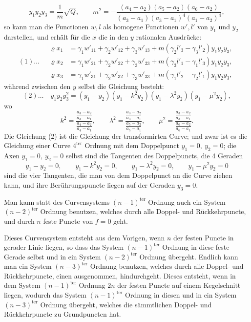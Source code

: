 \documentclass[10pt]{article}
\begin{document}
\[
y_1y_2y_3=\frac{1}{m}\sqrt Q,\qquad
m^2=-\frac{(a_4-a_2)(a_5-a_2)(a_6-a_2)}
{(a_3-a_1)(a_3-a_1)^4(a_1-a_2)^4},
\]
so kann man die Functionen \(w,l\) als homogene Functionen \(w',l'\) von \(y_1\) und \(y_2\) darstellen, und erhält für die \(x\) die in den \(y\) rationalen Ausdrücke:
\[
(1)\ldots\quad
\begin{aligned}
\varrho x_1&=\gamma_1w'_{11}+\gamma_2w'_{12}+\gamma_3w'_{13}
+m(\gamma_2l'_3-\gamma_3l'_2)y_1y_2y_3,\\
\varrho x_2&=\gamma_1w'_{21}+\gamma_2w'_{22}+\gamma_3w'_{23}
+m(\gamma_3l'_1-\gamma_1l'_3)y_1y_2y_3,\\
\varrho x_3&=\gamma_1w'_{31}+\gamma_2w'_{32}+\gamma_3w'_{33}
+m(\gamma_1l'_2-\gamma_2l'_1)y_1y_2y_3,
\end{aligned}
\]
während zwischen den \(y\) selbst die Gleichung besteht:
\[
(2)\ldots\quad
y_1y_2y_3^2=(y_1-y_2)(y_1-k^2y_2)(y_1-\lambda^2y_2)(y_1-\mu^2y_2),
\]
wo
\[
k^2=\frac{\frac{a_3-a_2}{a_3-a_1}}{\frac{a_4-a_2}{a_4-a_1}},
\qquad
\lambda^2=\frac{\frac{a_3-a_2}{a_3-a_1}}{\frac{a_5-a_2}{a_5-a_1}},
\qquad
\mu^2=\frac{\frac{a_3-a_2}{a_3-a_1}}{\frac{a_6-a_2}{a_6-a_1}}.
\]
Die Gleichung (2) ist die Gleichung der transformirten Curve; und zwar ist es die Gleichung einer Curve \(4^{\text{ter}}\) Ordnung mit dem Doppelpunct \(y_1=0,\ y_2=0\); die Axen \(y_1=0,\ y_2=0\) selbst sind die Tangenten des Doppelpuncts, die 4 Geraden
\[
y_1-y_2=0,\qquad y_1-k^2y_2=0,\qquad
y_1-\lambda^2y_2=0,\qquad y_1-\mu^2y_2=0
\]
sind die vier Tangenten, die man von dem Doppelpunct an die Curve ziehen kann, und ihre Berührungspuncte liegen auf der Geraden \(y_3=0\).

Man kann statt des Curvensystems \((n-1)^{\text{ter}}\) Ordnung auch ein System \((n-2)^{\text{ter}}\) Ordnung benutzen, welches durch alle Doppel- und Rückkehrpuncte, und durch \(n\) feste Puncte von \(f=0\) geht.

Dieses Curvensystem entsteht aus dem Vorigen, wenn \(n\) der festen Puncte in gerader Linie liegen, so dass das System \((n-1)^{\text{ter}}\) Ordnung in diese feste Gerade selbst und in ein System \((n-2)^{\text{ter}}\) Ordnung übergeht. Endlich kann man ein System \((n-3)^{\text{ter}}\) Ordnung benutzen, welches durch alle Doppel- und Rückkehrpuncte, einen ausgenommen, hindurchgeht. Dieses entsteht, wenn in dem System \((n-1)^{\text{ter}}\) Ordnung \(2n\) der festen Puncte auf einem Kegelschnitt liegen, wodurch das System \((n-1)^{\text{ter}}\) Ordnung in diesen und in ein System \((n-3)^{\text{ter}}\) Ordnung übergeht, welches die sämmtlichen Doppel- und Rückkehrpuncte zu Grundpuncten hat.
\end{document}
